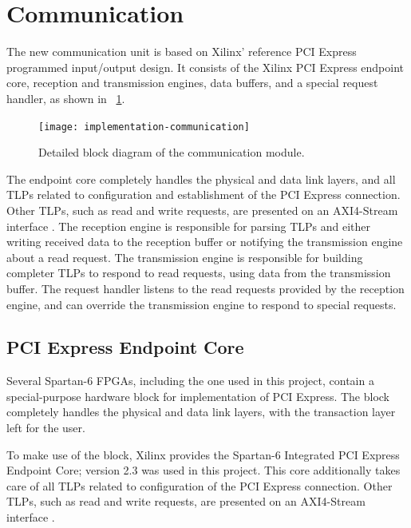 
\section{Communication}

The new communication unit is based on Xilinx' reference PCI Express programmed input/output design.
It consists of the Xilinx PCI Express endpoint core, reception and transmission engines, data buffers, and a special request handler, as shown in \figurename~\ref{fig:implementation-communication}.

\begin{figure}[!ht]
    \centering
    \texttt{[image: implementation-communication]}
    \caption[Communication module]{
        Detailed block diagram of the communication module.
    }
    \label{fig:implementation-communication}
\end{figure}

The endpoint core completely handles the physical and data link layers, and all TLPs related to configuration and establishment of the PCI Express connection.
Other TLPs, such as read and write requests, are presented on an AXI4-Stream interface \cite{ug672}.
The reception engine is responsible for parsing TLPs and either writing received data to the reception buffer or notifying the transmission engine about a read request.
The transmission engine is responsible for building completer TLPs to respond to read requests, using data from the transmission buffer.
The request handler listens to the read requests provided by the reception engine, and can override the transmission engine to respond to special requests.

\subsection{PCI Express Endpoint Core}

Several Spartan-6 FPGAs, including the one used in this project, contain a special-purpose hardware block for implementation of PCI Express.
The block completely handles the physical and data link layers, with the transaction layer left for the user.

To make use of the block, Xilinx provides the Spartan-6 Integrated PCI Express Endpoint Core; version 2.3 was used in this project.
This core additionally takes care of all TLPs related to configuration of the PCI Express connection.
Other TLPs, such as read and write requests, are presented on an AXI4-Stream interface \cite{ug672}.

